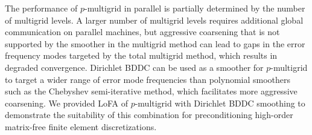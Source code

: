 The performance of $p$-multigrid in parallel is partially determined by the number of multigrid levels.
A larger number of multigrid levels requires additional global communication on parallel machines, but aggressive coarsening that is not supported by the smoother in the multigrid method can lead to gaps in the error frequency modes targeted by the total multigrid method, which results in degraded convergence.
Dirichlet BDDC can be used as a smoother for $p$-multigrid to target a wider range of error mode frequencies than polynomial smoothers such as the Chebyshev semi-iterative method, which facilitates more aggressive coarsening.
We provided LoFA of $p$-multigrid with Dirichlet BDDC smoothing to demonstrate the suitability of this combination for preconditioning high-order matrix-free finite element discretizations.
